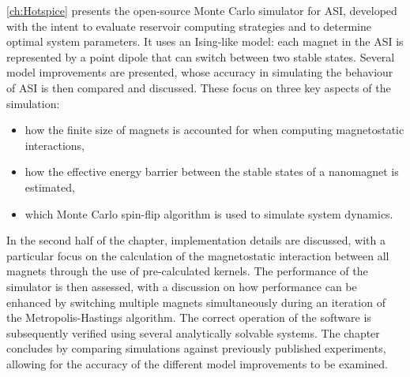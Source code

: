 \cref{ch:Hotspice} presents the open-source \hotspice Monte Carlo simulator for ASI, developed with the intent to evaluate reservoir computing strategies and to determine optimal system parameters.
It uses an Ising-like model: each magnet in the ASI is represented by a point dipole that can switch between two stable states.
Several model improvements are presented, whose accuracy in simulating the behaviour of ASI is then compared and discussed.
These focus on three key aspects of the simulation:
\begin{itemize}[noitemsep,nolistsep] %
	\item how the finite size of magnets is accounted for when computing magnetostatic interactions,
	\item how the effective energy barrier between the stable states of a nanomagnet is estimated,
	\item which Monte Carlo spin-flip algorithm is used to simulate system dynamics.
\end{itemize}
In the second half of the chapter, implementation details are discussed, with a particular focus on the calculation of the magnetostatic interaction between all magnets through the use of pre-calculated kernels.
The performance of the simulator is then assessed, with a discussion on how performance can be enhanced by switching multiple magnets simultaneously during an iteration of the Metropolis-Hastings algorithm.
The correct operation of the software is subsequently verified using several analytically solvable systems.
The chapter concludes by comparing simulations against previously published experiments, allowing for the accuracy of the different model improvements to be examined. \\

